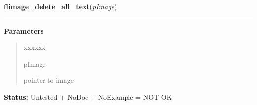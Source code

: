 \hspace{.8\funcindent}\begin{boxedminipage}{\funcwidth}

    \raggedright \textbf{flimage\_delete\_all\_text}(\textit{pImage})

    \vspace{-1.5ex}

    \rule{\textwidth}{0.5\fboxrule}
\setlength{\parskip}{2ex}
\setlength{\parskip}{1ex}
      \textbf{Parameters}
      \vspace{-1ex}

      \begin{quote}
        \begin{Ventry}{xxxxxx}

          \item[pImage]

          pointer to image

        \end{Ventry}

      \end{quote}

\textbf{Status:} Untested + NoDoc + NoExample = NOT OK



    \end{boxedminipage}

    \label{xformslib:library:flimage_add_marker}

    \vspace{0.5ex}

